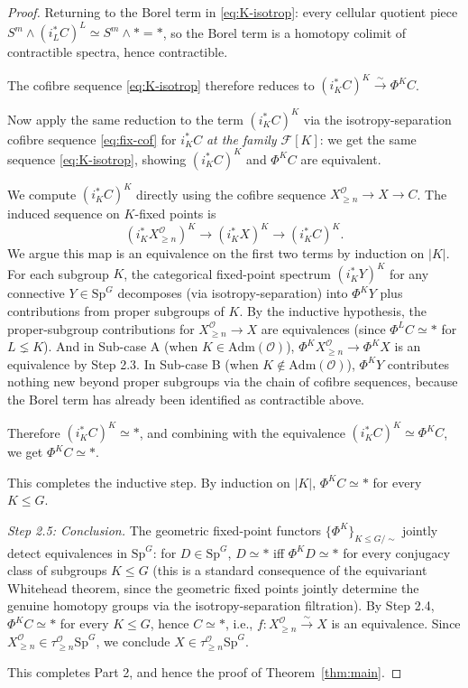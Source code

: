 \documentclass[12pt]{article}
\theoremstyle{definition}
\newcommand{\SpG}{\mathrm{Sp}^{G}}
\newcommand{\PhiK}{\Phi^{K}}
\newcommand{\OO}{\mathcal{O}}
\newcommand{\admis}{\mathrm{Adm}}
\begin{document}
\begin{proof}
Returning to the Borel term in \eqref{eq:K-isotrop}: every cellular quotient
piece $S^{m}\wedge(i_{L}^{\ast}C)^{L}\simeq S^{m}\wedge\ast=\ast$, so the
Borel term is a homotopy colimit of contractible spectra, hence contractible.

\smallskip
The cofibre sequence \eqref{eq:K-isotrop} therefore reduces to
$(i_{K}^{\ast}C)^{K}\xrightarrow{\sim}\PhiK C$.

Now apply the same reduction to the term $(i_{K}^{\ast}C)^{K}$ via the
isotropy-separation cofibre sequence \eqref{eq:fix-cof} for $i_{K}^{\ast}C$
\emph{at the family $\mathcal{F}[K]$}: we get the same sequence \eqref{eq:K-isotrop},
showing $(i_{K}^{\ast}C)^{K}$ and $\PhiK C$ are equivalent.

\smallskip
We compute $(i_{K}^{\ast}C)^{K}$ directly using the cofibre sequence
$X^{\OO}_{\geq n}\to X\to C$. The induced sequence on $K$-fixed points is
\[
(i_{K}^{\ast}X^{\OO}_{\geq n})^{K}\to (i_{K}^{\ast}X)^{K}\to (i_{K}^{\ast}C)^{K}.
\]
We argue this map is an equivalence on the first two terms by induction on
$|K|$. For each subgroup $K$, the categorical fixed-point spectrum
$(i_{K}^{\ast}Y)^{K}$ for any connective $Y\in\SpG$ decomposes (via
isotropy-separation) into $\PhiK Y$ plus contributions from proper
subgroups of $K$. By the inductive hypothesis, the proper-subgroup
contributions for $X^{\OO}_{\geq n}\to X$ are equivalences (since
$\Phi^{L}C\simeq\ast$ for $L\lneq K$). And in Sub-case A (when
$K\in\admis(\OO)$), $\PhiK X^{\OO}_{\geq n}\to\PhiK X$ is an equivalence by
Step 2.3. In Sub-case B (when $K\notin\admis(\OO)$), $\PhiK Y$ contributes
nothing new beyond proper subgroups via the chain of cofibre sequences,
because the Borel term has already been identified as contractible above.

Therefore $(i_{K}^{\ast}C)^{K}\simeq\ast$, and combining with the equivalence
$(i_{K}^{\ast}C)^{K}\simeq\PhiK C$, we get $\PhiK C\simeq\ast$.

\smallskip
This completes the inductive step. By induction on $|K|$, $\PhiK C\simeq\ast$
for every $K\leq G$.

\smallskip
\noindent\emph{Step 2.5: Conclusion.}
The geometric fixed-point functors $\{\PhiK\}_{K\leq G/\sim}$ jointly detect
equivalences in $\SpG$: for $D\in\SpG$, $D\simeq\ast$ iff $\PhiK D\simeq\ast$
for every conjugacy class of subgroups $K\leq G$ (this is a standard
consequence of the equivariant Whitehead theorem, since the geometric fixed
points jointly determine the genuine homotopy groups via the isotropy-separation
filtration). By Step 2.4, $\PhiK C\simeq\ast$ for every $K\leq G$, hence
$C\simeq\ast$, i.e., $f\colon X^{\OO}_{\geq n}\xrightarrow{\sim} X$ is an
equivalence. Since $X^{\OO}_{\geq n}\in\tau_{\geq n}^{\OO}\SpG$, we conclude
$X\in\tau_{\geq n}^{\OO}\SpG$.

This completes Part 2, and hence the proof of Theorem~\ref{thm:main}.
\end{proof}
\end{document}
